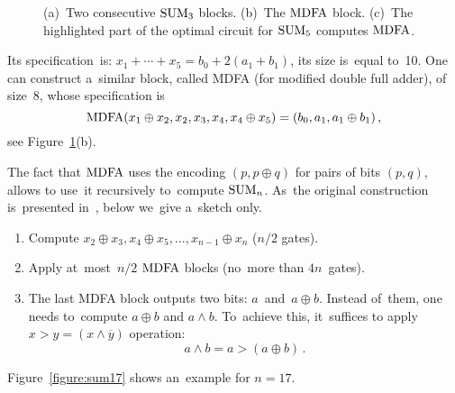 \begin{figure}
\begin{center}
\end{center}
\caption{(a)~Two consecutive $\operatorname{SUM}_3$ blocks. (b)~The $\operatorname{MDFA}$ block. (c)~The highlighted part of the optimal circuit
for $\operatorname{SUM}_5$ computes $\operatorname{MDFA}$.}
\label{figure:mdfa}
\end{figure}
%
Its specification~is: $x_1+\dotsb+x_5=b_0+2(a_1+b_1)$, its size is~equal to~10. One can construct a~similar block, called MDFA (for modified double full adder), of size~8, whose specification is
\[\operatorname{MDFA}(x_1 \oplus x_2, x_2, x_3, x_4, x_4 \oplus x_5)=(b_0, a_1, a_1 \oplus b_1) \, ,\]
see Figure~\ref{figure:mdfa}(b).

The fact that $\operatorname{MDFA}$ uses the encoding $(p, p \oplus q)$ for pairs of bits $(p,q)$, allows to use~it recursively
to~compute $\operatorname{SUM}_n$. As~the original construction is~presented in~\cite{DBLP:journals/ipl/DemenkovKKY10}, below we~give a~sketch
only.
\begin{enumerate}
    \item Compute $x_2 \oplus x_3, x_4 \oplus x_5, \dotsc, x_{n-1} \oplus x_n$ ($n/2$ gates).
    \item Apply at~most~$n/2$ $\operatorname{MDFA}$ blocks (no~more than $4n$~gates).
    \item The last MDFA block outputs two bits: $a$~and~$a\oplus b$. Instead of~them, one needs to~compute $a \oplus b$ and $a \land b$. To~achieve this,
    it~suffices to apply $x>y=(x \land \overline{y})$ operation:
    \[a \land b = a>(a \oplus b)\, .\]
\end{enumerate}
Figure~\ref{figure:sum17} shows an~example for $n=17$.

